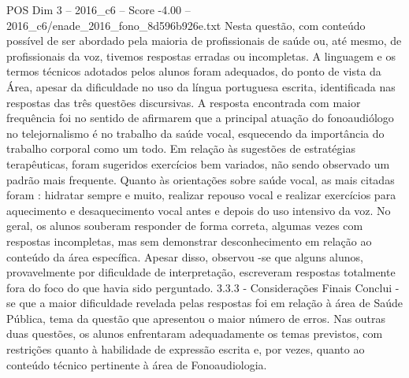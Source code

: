 \begin{textsample}{POS Dim 3 – 2016\_c6 – Score -4.00 – 2016\_c6/enade\_2016\_fono\_8d596b926e.txt}
Nesta questão, com conteúdo possível de ser abordado pela maioria de profissionais de saúde ou, até mesmo, de profissionais da voz, tivemos respostas erradas ou incompletas.
A linguagem e os termos técnicos adotados pelos alunos foram adequados, do ponto de vista da Área, apesar da dificuldade no uso da língua portuguesa escrita, identificada nas respostas das três questões discursivas.
A resposta encontrada com maior frequência foi no sentido de afirmarem que a principal atuação do fonoaudiólogo no telejornalismo é no trabalho da saúde vocal, esquecendo da importância do trabalho corporal como um todo.
Em relação às sugestões de estratégias terapêuticas, foram sugeridos exercícios bem variados, não sendo observado um padrão mais frequente.
Quanto às orientações sobre saúde vocal, as mais citadas foram : hidratar sempre e muito, realizar repouso vocal e realizar exercícios para aquecimento e desaquecimento vocal antes e depois do uso intensivo da voz.
No geral, os alunos souberam responder de forma correta, algumas vezes com respostas incompletas, mas sem demonstrar desconhecimento em relação ao conteúdo da área específica.
Apesar disso, observou -se que alguns alunos, provavelmente por dificuldade de interpretação, escreveram respostas totalmente fora do foco do que havia sido perguntado. 3.3.3 - Considerações Finais Conclui -se que a maior dificuldade revelada pelas respostas foi em relação à área de Saúde Pública, tema da questão que apresentou o maior número de erros.
Nas outras duas questões, os alunos enfrentaram adequadamente os temas previstos, com restrições quanto à habilidade de expressão escrita e, por vezes, quanto ao conteúdo técnico pertinente à área de Fonoaudiologia.

\end{textsample}
